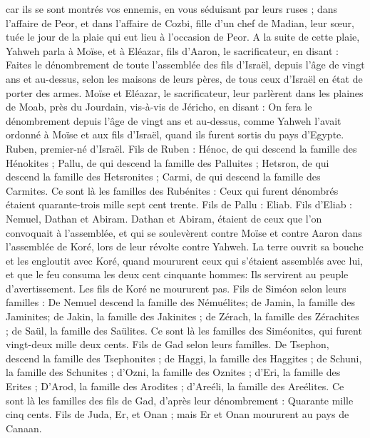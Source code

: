 \begin{multicols}{2}
car ils se sont montrés vos ennemis, en vous séduisant par leurs ruses ; dans l’affaire de Peor, et dans l’affaire de Cozbi, fille d'un chef de Madian, leur sœur, tuée le jour de la plaie qui eut lieu à l’occasion de Peor.
\VerseOne{}A la suite de cette plaie, Yahweh parla à Moïse, et à Eléazar, fils d'Aaron, le sacrificateur, en disant :
Faites le dénombrement de toute l'assemblée des fils d'Israël, depuis l'âge de vingt ans et au-dessus, selon les maisons de leurs pères, de tous ceux d'Israël en état de porter des armes.
Moïse et Eléazar, le sacrificateur, leur parlèrent dans les plaines de Moab, près du Jourdain, vis-à-vis de Jéricho, en disant :
On fera le dénombrement depuis l'âge de vingt ans et au-dessus, comme Yahweh l'avait ordonné à Moïse et aux fils d'Israël, quand ils furent sortis du pays d'Egypte.
Ruben, premier-né d'Israël. Fils de Ruben : Hénoc, de qui descend la famille des Hénokites ; Pallu, de qui descend la famille des Palluites ;
Hetsron, de qui descend la famille des Hetsronites ; Carmi, de qui descend la famille des Carmites.
Ce sont là les familles des Rubénites : Ceux qui furent dénombrés étaient quarante-trois mille sept cent trente.
Fils de Pallu : Eliab.
Fils d'Eliab : Nemuel, Dathan et Abiram. Dathan et Abiram, étaient de ceux que l'on convoquait à l'assemblée, et qui se soulevèrent contre Moïse et contre Aaron dans l'assemblée de Koré, lors de leur révolte contre Yahweh.
La terre ouvrit sa bouche et les engloutit avec Koré, quand moururent ceux qui s’étaient assemblés avec lui, et que le feu consuma les deux cent cinquante hommes: Ils servirent au peuple d’avertissement.
Les fils de Koré ne moururent pas.
Fils de Siméon selon leurs familles : De Nemuel descend la famille des Némuélites; de Jamin, la famille des Jaminites; de Jakin, la famille des Jakinites ;
de Zérach, la famille des Zérachites ; de Saül, la famille des Saülites.
Ce sont là les familles des Siméonites, qui furent vingt-deux mille deux cents.
Fils de Gad selon leurs familles. De Tsephon, descend la famille des Tsephonites ; de Haggi, la famille des Haggites ; de Schuni, la famille des Schunites ;
d'Ozni, la famille des Oznites ; d’Eri, la famille des Erites ;
D'Arod, la famille des Arodites ; d'Areéli, la famille des Areélites.
Ce sont là les familles des fils de Gad, d’après leur dénombrement : Quarante mille cinq cents.
Fils de Juda, Er, et Onan ; mais Er et Onan moururent au pays de Canaan.

\end{multicols}
